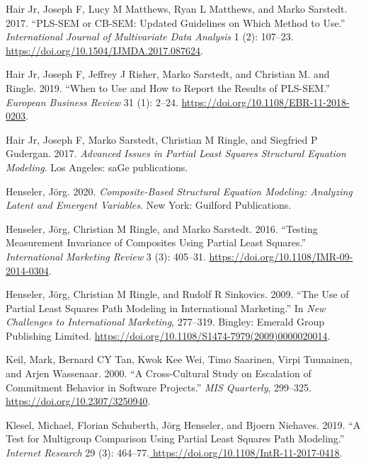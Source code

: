 \begin{CSLReferences}{1}{0}
\leavevmode{}%
Hair Jr, Joseph F, Lucy M Matthews, Ryan L Matthews, and Marko Sarstedt. 2017. {``PLS-SEM or CB-SEM: Updated Guidelines on Which Method to Use.''} \emph{International Journal of Multivariate Data Analysis} 1 (2): 107--23. \url{https://doi.org/10.1504/IJMDA.2017.087624}.

\leavevmode{}%
Hair Jr, Joseph F, Jeffrey J Risher, Marko Sarstedt, and Christian M. and Ringle. 2019. {``When to Use and How to Report the Results of PLS-SEM.''} \emph{European Business Review} 31 (1): 2--24. \url{https://doi.org/10.1108/EBR-11-2018-0203}.

\leavevmode{}%
Hair Jr, Joseph F, Marko Sarstedt, Christian M Ringle, and Siegfried P Gudergan. 2017. \emph{Advanced Issues in Partial Least Squares Structural Equation Modeling}. Los Angeles: saGe publications.

\leavevmode{}%
Henseler, Jörg. 2020. \emph{Composite-Based Structural Equation Modeling: Analyzing Latent and Emergent Variables}. New York: Guilford Publications.

\leavevmode{}%
Henseler, Jörg, Christian M Ringle, and Marko Sarstedt. 2016. {``Testing Measurement Invariance of Composites Using Partial Least Squares.''} \emph{International Marketing Review} 3 (3): 405--31. \url{https://doi.org/10.1108/IMR-09-2014-0304}.

\leavevmode{}%
Henseler, Jörg, Christian M Ringle, and Rudolf R Sinkovics. 2009. {``The Use of Partial Least Squares Path Modeling in International Marketing.''} In \emph{New Challenges to International Marketing}, 277--319. Bingley: Emerald Group Publishing Limited. \url{https://doi.org/10.1108/S1474-7979(2009)0000020014}.

\leavevmode{}%
Keil, Mark, Bernard CY Tan, Kwok Kee Wei, Timo Saarinen, Virpi Tuunainen, and Arjen Wassenaar. 2000. {``A Cross-Cultural Study on Escalation of Commitment Behavior in Software Projects.''} \emph{MIS Quarterly}, 299--325. \url{https://doi.org/10.2307/3250940}.

\leavevmode{}%
Klesel, Michael, Florian Schuberth, Jörg Henseler, and Bjoern Niehaves. 2019. {``A Test for Multigroup Comparison Using Partial Least Squares Path Modeling.''} \emph{Internet Research} 29 (3): 464--77.\href{\%20https://doi.org/10.1108/IntR-11-2017-0418}{ https://doi.org/10.1108/IntR-11-2017-0418}.


\end{CSLReferences}
